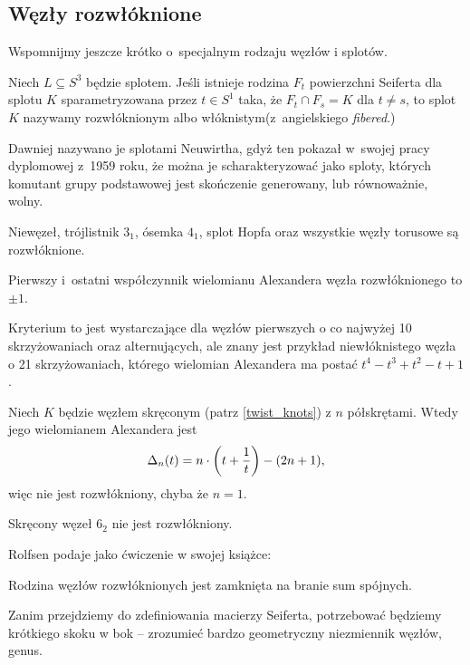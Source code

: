 \subsection{Węzły rozwłóknione}
Wspomnijmy jeszcze krótko o~specjalnym rodzaju węzłów i splotów.

\begin{definition}
    Niech $L \subseteq S^3$ będzie splotem.
    Jeśli istnieje rodzina $F_t$ powierzchni Seiferta dla splotu $K$ sparametryzowana przez $t \in S^1$ taka, że $F_t \cap F_s = K$ dla $t \neq s$, to splot $K$ nazywamy rozwłóknionym albo włóknistym(z~angielskiego \emph{fibered}.)
\end{definition}

Dawniej nazywano je splotami Neuwirtha, gdyż ten pokazał w~swojej pracy dyplomowej z~1959 roku, że można je scharakteryzować jako sploty, których komutant grupy podstawowej jest skończenie generowany, lub równoważnie, wolny.

\begin{example}
    Niewęzeł, trójlistnik $3_1$, ósemka $4_1$, splot Hopfa oraz wszystkie węzły torusowe są rozwłóknione.
\end{example}

\begin{proposition}
    Pierwszy i~ostatni współczynnik wielomianu Alexandera węzła rozwłóknionego to $\pm 1$.
\end{proposition}

Kryterium to jest wystarczające dla węzłów pierwszych o co najwyżej 10 skrzyżowaniach oraz alternujących, ale znany jest przykład niewłóknistego węzła o 21 skrzyżowaniach, którego wielomian Alexandera ma postać $t^4 - t^3 + t^2 - t +1$.

\begin{proposition}
    Niech $K$ będzie węzłem skręconym (patrz \ref{twist_knots}) z $n$ półskrętami.
    Wtedy jego wielomianem Alexandera jest
    \begin{equation}
        \Delta_n(t) = n \cdot \left(t + \frac 1 t\right)  - (2n+1),
    \end{equation}
    więc nie jest rozwłókniony, chyba że $n = 1$.
\end{proposition}

\begin{corollary}
    Skręcony węzeł $6_2$ nie jest rozwłókniony.
\end{corollary}

Rolfsen podaje jako ćwiczenie w swojej książce:

\begin{proposition}
    Rodzina węzłów rozwłóknionych jest zamknięta na branie sum spójnych.
\end{proposition}

Zanim przejdziemy do zdefiniowania macierzy Seiferta, potrzebować będziemy krótkiego skoku w bok -- zrozumieć bardzo geometryczny niezmiennik węzłów, genus.
